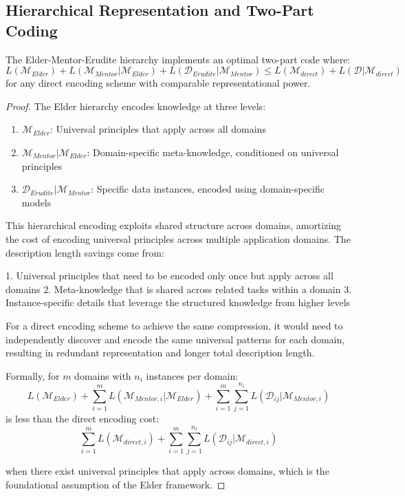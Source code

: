 \subsection{Hierarchical Representation and Two-Part Coding}

\begin{theorem}
The Elder-Mentor-Erudite hierarchy implements an optimal two-part code where:
\begin{equation}
L(\mathcal{M}_{Elder}) + L(\mathcal{M}_{Mentor} | \mathcal{M}_{Elder}) + L(\mathcal{D}_{Erudite} | \mathcal{M}_{Mentor}) \leq L(\mathcal{M}_{direct}) + L(\mathcal{D} | \mathcal{M}_{direct})
\end{equation}
for any direct encoding scheme with comparable representational power.
\end{theorem}

\begin{proof}
The Elder hierarchy encodes knowledge at three levels:
\begin{enumerate}
    \item $\mathcal{M}_{Elder}$: Universal principles that apply across all domains
    \item $\mathcal{M}_{Mentor} | \mathcal{M}_{Elder}$: Domain-specific meta-knowledge, conditioned on universal principles
    \item $\mathcal{D}_{Erudite} | \mathcal{M}_{Mentor}$: Specific data instances, encoded using domain-specific models
\end{enumerate}

This hierarchical encoding exploits shared structure across domains, amortizing the cost of encoding universal principles across multiple application domains. The description length savings come from:

1. Universal principles that need to be encoded only once but apply across all domains
2. Meta-knowledge that is shared across related tasks within a domain
3. Instance-specific details that leverage the structured knowledge from higher levels

For a direct encoding scheme to achieve the same compression, it would need to independently discover and encode the same universal patterns for each domain, resulting in redundant representation and longer total description length.

Formally, for $m$ domains with $n_i$ instances per domain:
\begin{equation}
L(\mathcal{M}_{Elder}) + \sum_{i=1}^m L(\mathcal{M}_{Mentor,i} | \mathcal{M}_{Elder}) + \sum_{i=1}^m \sum_{j=1}^{n_i} L(\mathcal{D}_{ij} | \mathcal{M}_{Mentor,i})
\end{equation}
is less than the direct encoding cost:
\begin{equation}
\sum_{i=1}^m L(\mathcal{M}_{direct,i}) + \sum_{i=1}^m \sum_{j=1}^{n_i} L(\mathcal{D}_{ij} | \mathcal{M}_{direct,i})
\end{equation}

when there exist universal principles that apply across domains, which is the foundational assumption of the Elder framework.
\end{proof}

